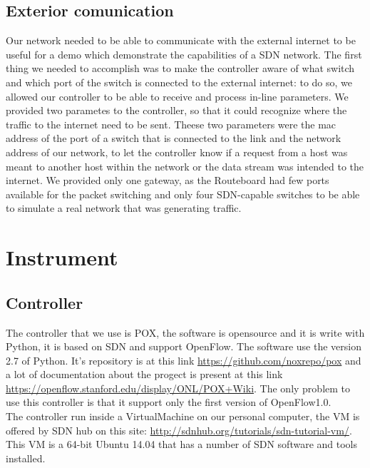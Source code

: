 \documentclass[conference,10pt]{IEEEtran}
\begin{document}
\subsection{Exterior comunication}
Our network needed to be able to communicate with the external internet to be useful for a demo which demonstrate the capabilities of a SDN network.
The first thing we needed to accomplish was to make the controller aware of what switch and which port of the switch is connected to the external internet:
to do so, we allowed our controller to be able to receive and process in-line parameters. We provided two parametes to the controller, so that
it could recognize where the traffic to the internet need to be sent. Theese two parameters were the mac address of the
port of a switch that is connected to the link and the network address of our network, to let the controller know if a request from a host was meant to another host
within the network or the data stream was intended to the internet. We provided only one gateway, as the Routeboard had few ports available for the packet switching
and only four SDN-capable switches to be able to simulate a real network that was generating traffic.


\section{Instrument}\label{sec:instrument}
\subsection{Controller}
The controller that we use is POX, the software is opensource and it is write with Python, it is based on SDN and support OpenFlow.
The software use the version 2.7 of Python.
It's repository is at this link \url{https://github.com/noxrepo/pox} and a lot of documentation about the progect
is present at this link \url{https://openflow.stanford.edu/display/ONL/POX+Wiki}.
The only problem to use this controller is that it support only the first version of OpenFlow1.0.
\\
The controller run inside a VirtualMachine on our personal computer,
the VM is offered by SDN hub on this site: \url{http://sdnhub.org/tutorials/sdn-tutorial-vm/}.
This VM is a 64-bit Ubuntu 14.04 that has a number of SDN software and tools installed.
\end{document}
